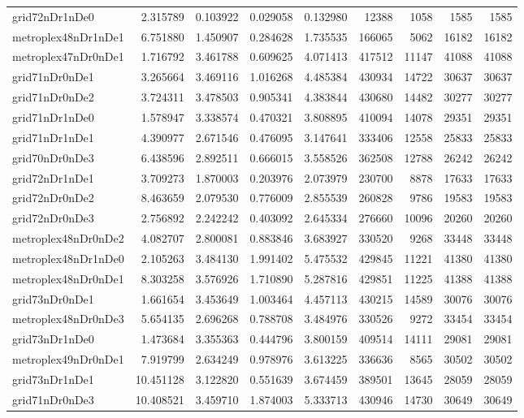 \documentclass[../../../thesis.tex]{subfiles}
\begin{document}
\begin{longtable}{|l|r|r|r|r|r|r|r|r|}
grid72nDr1nDe0 & 2.315789 & 0.103922 & 0.029058 & 0.132980 & 12388 & 1058 & 1585 & 1585 \\
metroplex48nDr1nDe1 & 6.751880 & 1.450907 & 0.284628 & 1.735535 & 166065 & 5062 & 16182 & 16182 \\
metroplex47nDr0nDe1 & 1.716792 & 3.461788 & 0.609625 & 4.071413 & 417512 & 11147 & 41088 & 41088 \\
grid71nDr0nDe1 & 3.265664 & 3.469116 & 1.016268 & 4.485384 & 430934 & 14722 & 30637 & 30637 \\
grid71nDr0nDe2 & 3.724311 & 3.478503 & 0.905341 & 4.383844 & 430680 & 14482 & 30277 & 30277 \\
grid71nDr1nDe0 & 1.578947 & 3.338574 & 0.470321 & 3.808895 & 410094 & 14078 & 29351 & 29351 \\
grid71nDr1nDe1 & 4.390977 & 2.671546 & 0.476095 & 3.147641 & 333406 & 12558 & 25833 & 25833 \\
grid70nDr0nDe3 & 6.438596 & 2.892511 & 0.666015 & 3.558526 & 362508 & 12788 & 26242 & 26242 \\
grid72nDr1nDe1 & 3.709273 & 1.870003 & 0.203976 & 2.073979 & 230700 & 8878 & 17633 & 17633 \\
grid72nDr0nDe2 & 8.463659 & 2.079530 & 0.776009 & 2.855539 & 260828 & 9786 & 19583 & 19583 \\
grid72nDr0nDe3 & 2.756892 & 2.242242 & 0.403092 & 2.645334 & 276660 & 10096 & 20260 & 20260 \\
metroplex48nDr0nDe2 & 4.082707 & 2.800081 & 0.883846 & 3.683927 & 330520 & 9268 & 33448 & 33448 \\
metroplex48nDr1nDe0 & 2.105263 & 3.484130 & 1.991402 & 5.475532 & 429845 & 11221 & 41380 & 41380 \\
metroplex48nDr0nDe1 & 8.303258 & 3.576926 & 1.710890 & 5.287816 & 429851 & 11225 & 41388 & 41388 \\
grid73nDr0nDe1 & 1.661654 & 3.453649 & 1.003464 & 4.457113 & 430215 & 14589 & 30076 & 30076 \\
metroplex48nDr0nDe3 & 5.654135 & 2.696268 & 0.788708 & 3.484976 & 330526 & 9272 & 33454 & 33454 \\
grid73nDr1nDe0 & 1.473684 & 3.355363 & 0.444796 & 3.800159 & 409514 & 14111 & 29081 & 29081 \\
metroplex49nDr0nDe1 & 7.919799 & 2.634249 & 0.978976 & 3.613225 & 336636 & 8565 & 30502 & 30502 \\
grid73nDr1nDe1 & 10.451128 & 3.122820 & 0.551639 & 3.674459 & 389501 & 13645 & 28059 & 28059 \\
grid71nDr0nDe3 & 10.408521 & 3.459710 & 1.874003 & 5.333713 & 430946 & 14730 & 30649 & 30649 \\

\end{longtable}
\end{document}
